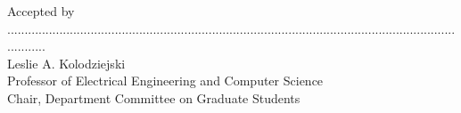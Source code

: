 \begin{titlepage}
    Accepted by ............................................................................................................................................ \\
    Leslie A. Kolodziejski \\
    Professor of Electrical Engineering and Computer Science \\
    Chair,  Department  Committee  on  Graduate  Students

\restoregeometry
\end{titlepage}
\setcounter{page}{2}